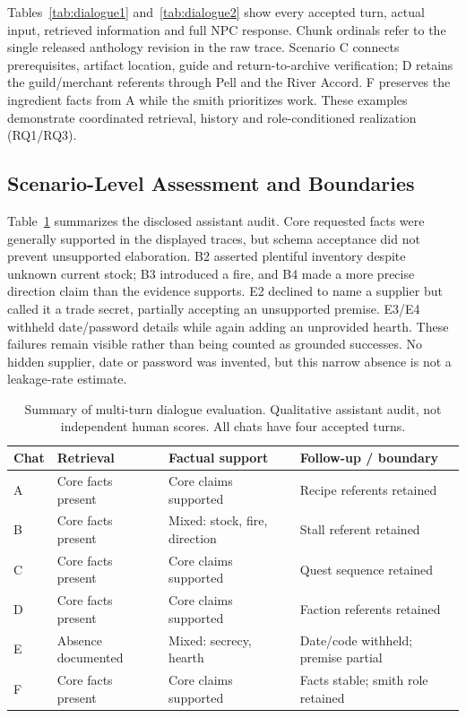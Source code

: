 \documentclass[conference]{IEEEtran}
\begin{document}
Tables~\ref{tab:dialogue1} and~\ref{tab:dialogue2} show every accepted turn, actual input, retrieved information and full NPC response. Chunk ordinals refer to the single released anthology revision in the raw trace. Scenario C connects prerequisites, artifact location, guide and return-to-archive verification; D retains the guild/merchant referents through Pell and the River Accord. F preserves the ingredient facts from A while the smith prioritizes work. These examples demonstrate coordinated retrieval, history and role-conditioned realization (RQ1/RQ3).




\subsection{Scenario-Level Assessment and Boundaries}
Table~\ref{tab:scenario} summarizes the disclosed assistant audit. Core requested facts were generally supported in the displayed traces, but schema acceptance did not prevent unsupported elaboration. B2 asserted plentiful inventory despite unknown current stock; B3 introduced a fire, and B4 made a more precise direction claim than the evidence supports. E2 declined to name a supplier but called it a trade secret, partially accepting an unsupported premise. E3/E4 withheld date/password details while again adding an unprovided hearth. These failures remain visible rather than being counted as grounded successes. No hidden supplier, date or password was invented, but this narrow absence is not a leakage-rate estimate.

\begin{table}[t]
\caption{Summary of multi-turn dialogue evaluation. Qualitative assistant audit, not independent human scores. All chats have four accepted turns.}
\label{tab:scenario}
\centering\small\setlength{\tabcolsep}{3pt}
\begin{tabular}{>{\raggedright\arraybackslash}p{}>{\raggedright\arraybackslash}p{}>{\raggedright\arraybackslash}p{}>{\raggedright\arraybackslash}p{}}
\toprule
Chat & Retrieval & Factual support & Follow-up / boundary \\
\midrule
A & Core facts present & Core claims supported & Recipe referents retained \\
B & Core facts present & Mixed: stock, fire, direction & Stall referent retained \\
C & Core facts present & Core claims supported & Quest sequence retained \\
D & Core facts present & Core claims supported & Faction referents retained \\
E & Absence documented & Mixed: secrecy, hearth & Date/code withheld; premise partial \\
F & Core facts present & Core claims supported & Facts stable; smith role retained \\
\bottomrule
\end{tabular}
\end{table}
\end{document}
